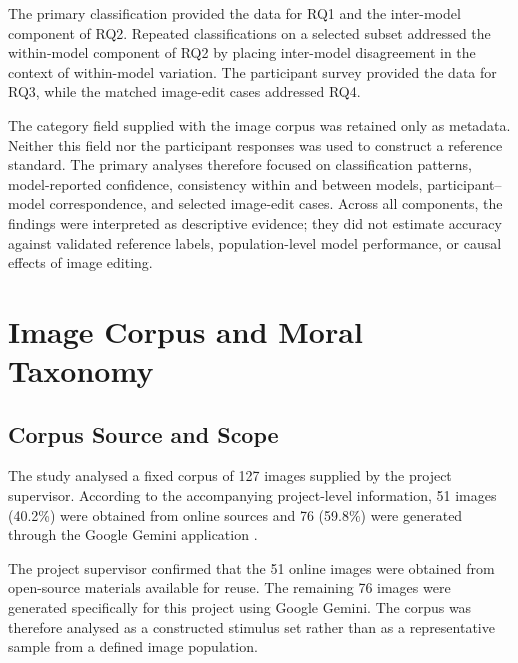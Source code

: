 \FloatBarrier

The primary classification provided the data for RQ1 and the inter-model
component of RQ2. Repeated classifications on a selected subset addressed the
within-model component of RQ2 by placing inter-model disagreement in the
context of within-model variation. The participant survey provided the data
for RQ3, while the matched image-edit cases addressed RQ4.

The category field supplied with the image corpus was retained only as
metadata. Neither this field nor the participant responses was used to
construct a reference standard. The primary analyses therefore focused on
classification patterns, model-reported confidence, consistency within and
between models, participant--model correspondence, and selected image-edit
cases. Across all components, the findings were interpreted as descriptive
evidence; they did not estimate accuracy against validated reference labels,
population-level model performance, or causal effects of image editing.




\section{Image Corpus and Moral Taxonomy}
\label{sec:image_dataset}

\subsection{Corpus Source and Scope}
\label{subsec:image_collection}

The study analysed a fixed corpus of 127 images supplied by the project
supervisor. According to the accompanying project-level information, 51 images
(40.2\%) were obtained from online sources and 76 (59.8\%) were generated
through the Google Gemini application \cite{google2026geminiimages}.

The project supervisor confirmed that the 51 online images were obtained from
open-source materials available for reuse. The remaining 76 images were
generated specifically for this project using Google Gemini. The corpus was
therefore analysed as a constructed stimulus set rather than as a
representative sample from a defined image population.

